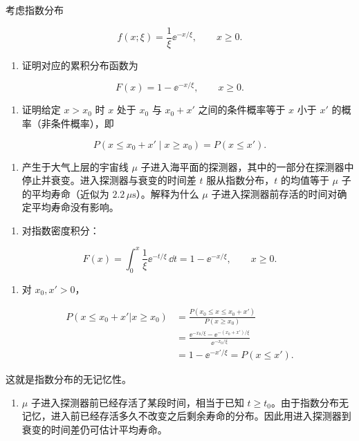 \begin{question}
考虑指数分布

\[
f(x;\xi)=\frac{1}{\xi}\ee^{-x/\xi},\qquad x\ge0.
\]

\begin{enumerate}
\item
  证明对应的累积分布函数为
\end{enumerate}

\[
F(x)=1-\ee^{-x/\xi},\qquad x\ge0.
\]

\begin{enumerate}[start=2]
\item
  证明给定 \(x>x_0\) 时 \(x\) 处于 \(x_0\) 与 \(x_0+x'\)
  之间的条件概率等于 \(x\) 小于 \(x'\) 的概率（非条件概率），即
\end{enumerate}

\[
P(x\le x_0+x'\mid x\ge x_0)=P(x\le x').
\]

\begin{enumerate}[start=3]
\item
  产生于大气上层的宇宙线 \(\mu\)
  子进入海平面的探测器，其中的一部分在探测器中停止并衰变。进入探测器与衰变的时间差
  \(t\) 服从指数分布，\(t\) 的均值等于 \(\mu\) 子的平均寿命（近似为
  \(2.2\,\mu\mathrm{s}\)）。解释为什么 \(\mu\)
  子进入探测器前存活的时间对确定平均寿命没有影响。
\end{enumerate}
\begin{solution}
\begin{enumerate}
\item
  对指数密度积分：
\end{enumerate}

\[
F(x)=\int_0^x\frac1\xi \ee^{-t/\xi}\,\dd{t}=1-\ee^{-x/\xi},\qquad x\ge0.
\]

\begin{enumerate}[start=2]
\item
  对 \(x_0,x'>0\)，
\end{enumerate}

\[
\begin{split}
P(x\le x_0+x'|x\ge x_0)
&=\frac{P(x_0\le x\le x_0+x')}{P(x\ge x_0)}\\
&=\frac{\ee^{-x_0/\xi}-\ee^{-(x_0+x')/\xi}}{\ee^{-x_0/\xi}}\\
&=1-\ee^{-x'/\xi}=P(x\le x').
\end{split}
\]

这就是指数分布的无记忆性。

\begin{enumerate}[start=3]
\item
  \(\mu\) 子进入探测器前已经存活了某段时间，相当于已知
  \(t\ge t_0\)。由于指数分布无记忆，进入前已经存活多久不改变之后剩余寿命的分布。因此用进入探测器到衰变的时间差仍可估计平均寿命。
\end{enumerate}
\end{solution}
\end{question}


